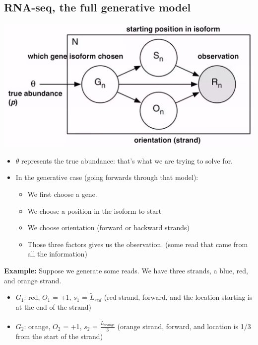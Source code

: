 \documentclass[10pt]{article}
\begin{document}
\subsection*{RNA-seq, the full generative model}
\begin{center}
    \includegraphics*[scale=1]{W5_5.png}
\end{center}
\begin{itemize}
    \item $\theta$ represents the true abundance: that's what we are trying to solve for.
    \item In the generative case (going forwards through that model):
    \begin{itemize}
        \item We first choose a gene.
        \item We choose a position in the isoform to start
        \item We choose orientation (forward or backward strands)
        \item Those three factors gives us the observation. (some read that came from all the information)
    \end{itemize}
\end{itemize}
\textbf{Example:} Suppose we generate some reads.  We have three strands, a blue, red, and orange strand.
\begin{itemize}
    \item $G_1$: red, $O_1$ = +1, $s_1$ = $\tilde{L}_{red}$   (red strand, forward, and the location starting is at the end of the strand)
    \item $G_2$: orange, $O_2$ = +1, $s_2$ = $\frac{\tilde{L}_{orange}}{3}$ (orange strand, forward, and location is 1/3 from the start of the strand)
\end{itemize}
\end{document}
